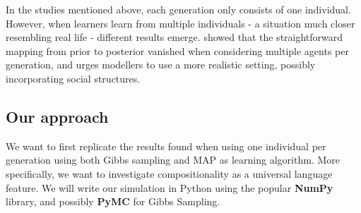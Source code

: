 \documentclass[12pt]{scrartcl}
\begin{document}
In the studies mentioned above, each generation only consists of one individual. However, when learners learn from multiple individuals - a situation much closer resembling real life - different results emerge. \textcite{smith2009iterated} showed that the straightforward mapping from prior to posterior vanished when considering multiple agents per generation, and urges modellers to use a more realistic setting, possibly incorporating social structures.

\subsection*{Our approach}
We want to first replicate the results found when using one individual per generation using both Gibbs sampling and MAP as learning algorithm. More specifically, we want to investigate compositionality as a universal language feature. We will write our simulation in Python using the popular \textbf{NumPy} library, and possibly \textbf{PyMC} for Gibbs Sampling.



\newpage
\printbibliography
\end{document}
